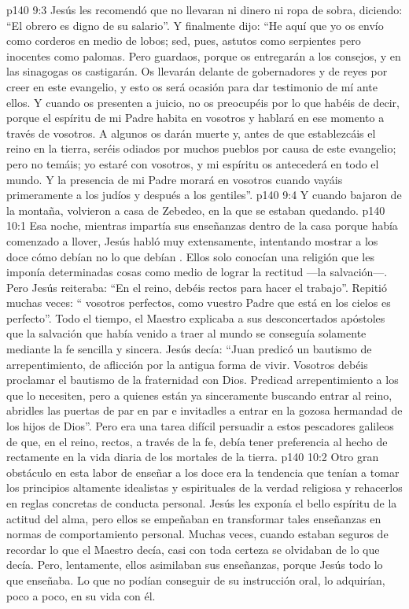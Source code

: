 \vs p140 9:3 Jesús les recomendó que no llevaran ni dinero ni ropa de sobra, diciendo: “El obrero es digno de su salario”. Y finalmente dijo: “He aquí que yo os envío como corderos en medio de lobos; sed, pues, astutos como serpientes pero inocentes como palomas. Pero guardaos, porque os entregarán a los consejos, y en las sinagogas os castigarán. Os llevarán delante de gobernadores y de reyes por creer en este evangelio, y esto os será ocasión para dar testimonio de mí ante ellos. Y cuando os presenten a juicio, no os preocupéis por lo que habéis de decir, porque el espíritu de mi Padre habita en vosotros y hablará en ese momento a través de vosotros. A algunos os darán muerte y, antes de que establezcáis el reino en la tierra, seréis odiados por muchos pueblos por causa de este evangelio; pero no temáis; yo estaré con vosotros, y mi espíritu os antecederá en todo el mundo. Y la presencia de mi Padre morará en vosotros cuando vayáis primeramente a los judíos y después a los gentiles”.
\vs p140 9:4 \pc Y cuando bajaron de la montaña, volvieron a casa de Zebedeo, en la que se estaban quedando.
\vs p140 10:1 Esa noche, mientras impartía sus enseñanzas dentro de la casa porque había comenzado a llover, Jesús habló muy extensamente, intentando mostrar a los doce cómo debían  no lo que debían . Ellos solo conocían una religión que les imponía  determinadas cosas como medio de lograr la rectitud ---la salvación---. Pero Jesús reiteraba: “En el reino, debéis  rectos para hacer el trabajo”. Repitió muchas veces: “ vosotros perfectos, como vuestro Padre que está en los cielos es perfecto”. Todo el tiempo, el Maestro explicaba a sus desconcertados apóstoles que la salvación que había venido a traer al mundo se conseguía solamente  mediante la fe sencilla y sincera. Jesús decía: “Juan predicó un bautismo de arrepentimiento, de aflicción por la antigua forma de vivir. Vosotros debéis proclamar el bautismo de la fraternidad con Dios. Predicad arrepentimiento a los que lo necesiten, pero a quienes están ya sinceramente buscando entrar al reino, abridles las puertas de par en par e invitadles a entrar en la gozosa hermandad de los hijos de Dios”. Pero era una tarea difícil persuadir a estos pescadores galileos de que, en el reino,  rectos, a través de la fe, debía tener preferencia al hecho de  rectamente en la vida diaria de los mortales de la tierra.
\vs p140 10:2 \pc Otro gran obstáculo en esta labor de enseñar a los doce era la tendencia que tenían a tomar los principios altamente idealistas y espirituales de la verdad religiosa y rehacerlos en reglas concretas de conducta personal. Jesús les exponía el bello espíritu de la actitud del alma, pero ellos se empeñaban en transformar tales enseñanzas en normas de comportamiento personal. Muchas veces, cuando estaban seguros de recordar lo que el Maestro decía, casi con toda certeza se olvidaban de lo que  decía. Pero, lentamente, ellos asimilaban sus enseñanzas, porque Jesús  todo lo que enseñaba. Lo que no podían conseguir de su instrucción oral, lo adquirían, poco a poco, en su vida con él.
